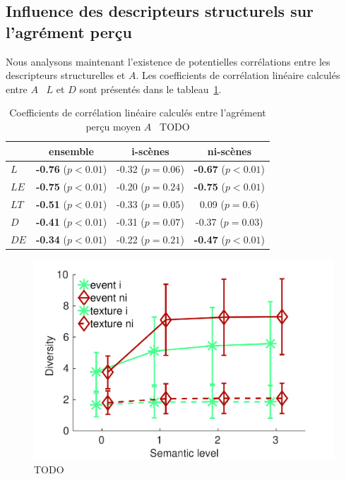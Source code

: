 \subsection{Influence des descripteurs structurels sur l'agrément perçu}

Nous analysons maintenant l'existence de potentielles corrélations entre les descripteurs structurelles et $A$. Les coefficients de corrélation linéaire calculés entre $A$ \vs~$L$ et $D$ sont présentés dans le tableau~\ref{tab:corrStructA}.

\begin{table}[t]
\centering
\begin{tabular}{l c c c} 
            & ensemble                     & i-scènes                   & ni-scènes    \\
\hline
$L$         & \textbf{-0.76} ($p<0.01$)    & -0.32 ($p=0.06$)           & \textbf{-0.67} ($p<0.01$)\\
$LE$        & \textbf{-0.75} ($p<0.01$)    & -0.20 ($p=0.24$)           & \textbf{-0.75} ($p<0.01$)\\
$LT$        & \textbf{-0.51} ($p<0.01$)    & -0.33 ($p=0.05$)           &  0.09  ($p=0.6$) \\
$D$         & \textbf{-0.41} ($p<0.01$)    & -0.31 ($p=0.07$)           & -0.37 ($p=0.03$)\\
$DE$        & \textbf{-0.34} ($p<0.01$)    & -0.22 ($p=0.21$)           & \textbf{-0.47} ($p<0.01$)\\
\hline
\end{tabular}
\vspace{0.5mm}
\caption{Coefficients de corrélation linéaire calculés entre l'agrément perçu moyen $A$ \vs~TODO}
\label{tab:corrStructA}
\end{table}

\begin{figure}[bth]
        \myfloatalign
        \includegraphics[width=.9\linewidth]{gfxXpUrbanSoundscape/xp1_div_1}
       \caption[TODO]{TODO}\label{fig:diversity}
\end{figure}

